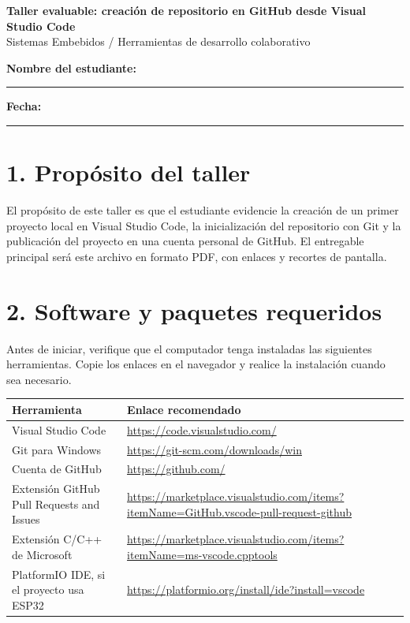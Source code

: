 \documentclass[12pt,onecolumn]{article}
\begin{document}
\begin{center}

{\Large \textbf{Taller evaluable: creación de repositorio en GitHub desde Visual Studio Code}}\\
{\normalsize Sistemas Embebidos / Herramientas de desarrollo colaborativo}\\[0.5em]
\end{center}

\noindent\textbf{Nombre del estudiante:} \rule{8cm}{0.4pt}\hfill
\textbf{Fecha:} \rule{3cm}{0.4pt}

\section*{1. Propósito del taller}
El propósito de este taller es que el estudiante evidencie la creación de un primer proyecto local en Visual Studio Code, la inicialización del repositorio con Git y la publicación del proyecto en una cuenta personal de GitHub. El entregable principal será este archivo en formato PDF, con enlaces y recortes de pantalla.

\section*{2. Software y paquetes requeridos}
Antes de iniciar, verifique que el computador tenga instaladas las siguientes herramientas. Copie los enlaces en el navegador y realice la instalación cuando sea necesario.

\begin{table}[H]
\centering
\small
\begin{tabularx}{\textwidth}{p{3.2cm}X}
\toprule
\textbf{Herramienta} & \textbf{Enlace recomendado} \\
\midrule
Visual Studio Code & \url{https://code.visualstudio.com/} \\
Git para Windows & \url{https://git-scm.com/downloads/win} \\
Cuenta de GitHub & \url{https://github.com/} \\
Extensión GitHub Pull Requests and Issues & \url{https://marketplace.visualstudio.com/items?itemName=GitHub.vscode-pull-request-github} \\
Extensión C/C++ de Microsoft & \url{https://marketplace.visualstudio.com/items?itemName=ms-vscode.cpptools} \\
PlatformIO IDE, si el proyecto usa ESP32 & \url{https://platformio.org/install/ide?install=vscode} \\
\bottomrule
\end{tabularx}
\end{table}
\end{document}
